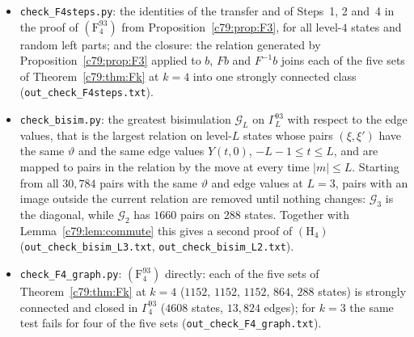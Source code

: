 \begin{itemize}
\item \texttt{check\_F4steps.py}: the identities of the transfer and of Steps~1, 2 and~4 in the proof of $(\mathrm F^{93}_4)$ from Proposition~\ref{c79:prop:F3}, for all level-$4$ states and random left parts; and the closure: the relation generated by Proposition~\ref{c79:prop:F3} applied to $b$, $Fb$ and $F^{-1}b$ joins each of the five sets of Theorem~\ref{c79:thm:Fk} at $k=4$ into one strongly connected class (\texttt{out\_check\_F4steps.txt}).
\item \texttt{check\_bisim.py}: the greatest bisimulation $\mathcal G_L$ on $\Gamma^{93}_L$ with respect to the edge values, that is the largest relation on level-$L$ states whose pairs $(\xi,\xi')$ have the same $\vartheta$ and the same edge values $Y(t,0)$, $-L-1\le t\le L$, and are mapped to pairs in the relation by the move at every time $|m|\le L$. Starting from all $30{,}784$ pairs with the same $\vartheta$ and edge values at $L=3$, pairs with an image outside the current relation are removed until nothing changes: $\mathcal G_3$ is the diagonal, while $\mathcal G_2$ has $1660$ pairs on $288$ states. Together with Lemma~\ref{c79:lem:commute} this gives a second proof of $(\mathrm H_4)$ (\texttt{out\_check\_bisim\_L3.txt}, \texttt{out\_check\_bisim\_L2.txt}).
\item \texttt{check\_F4\_graph.py}: $(\mathrm F^{93}_4)$ directly: each of the five sets of Theorem~\ref{c79:thm:Fk} at $k=4$ ($1152$, $1152$, $1152$, $864$, $288$ states) is strongly connected and closed in $\Gamma^{93}_4$ ($4608$ states, $13{,}824$ edges); for $k=3$ the same test fails for four of the five sets (\texttt{out\_check\_F4\_graph.txt}).
\end{itemize}
